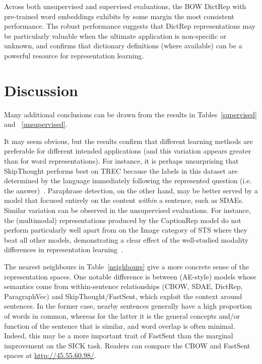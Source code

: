 \documentclass[11pt,letterpaper]{article}
\begin{document}
Across both unsupervised and supervised evaluations, the BOW DictRep with pre-trained word embeddings exhibits by some margin the most consistent performance. Ths robust performance suggests that DictRep representations may be particularly valuable when the ultimate application is non-specific or unknown, and confirms that dictionary definitions (where available) can be a powerful resource for representation learning.  

\section{Discussion}


Many additional conclusions can be drawn from the results in Tables~\ref{supervised} and ~\ref{unsupervised}. 

\vspace{5pt} It may seem obvious, but the results confirm that different learning methods are preferable for different intended applications (and this variation appears greater than for word representations). For instance, it is perhaps unsurprising that SkipThought performs best on TREC because the labels in this dataset are determined by the language immediately following the represented question (i.e. the answer)~\cite{voorhees2002overview}. Paraphrase detection, on the other hand, may be better served by a model that focused entirely on the content \emph{within} a sentence, such as SDAEs. Similar variation can be observed in the unsupervised evaluations. For instance, the (multimodal) representations produced by the CaptionRep model do not perform particularly well apart from on the Image category of STS where they beat all other models, demonstrating a clear effect of the well-studied modality differences in representation learning~\cite{bruni2014multimodal}. 

The nearest neighbours in Table~\ref{neighbours} give a more concrete sense of the representation spaces. One notable difference is between (AE-style) models whose semantics come from within-sentence relationships (CBOW, SDAE, DictRep, ParagraphVec) and SkipThought/FastSent, which exploit the context around sentences. In the former case, nearby sentences generally have a high proportion of words in common, whereas for the latter it is the general concepts and/or function of the sentence that is similar, and word overlap is often minimal. Indeed, this may be a more important trait of FastSent than the marginal improvement on the SICK task. Readers can compare the CBOW and FastSent spaces at \url{http://45.55.60.98/}.
\end{document}
